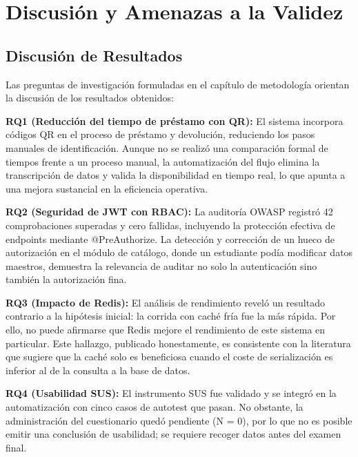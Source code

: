 \documentclass[
11pt,
a4paper,
]{report}
\begin{document}
	\hypertarget{discusion-y-amenazas-a-la-validez}{%
		\chapter{Discusión y Amenazas a la Validez}\label{discusion-y-amenazas-a-la-validez}}
	
	\hypertarget{discusion-de-resultados}{%
		\section{Discusión de Resultados}\label{discusion-de-resultados}}
	
	Las preguntas de investigación formuladas en el capítulo de metodología orientan la discusión de los resultados obtenidos:
	
	\textbf{RQ1 (Reducción del tiempo de préstamo con QR):} El sistema incorpora códigos QR en el proceso de préstamo y devolución, reduciendo los pasos manuales de identificación. Aunque no se realizó una comparación formal de tiempos frente a un proceso manual, la automatización del flujo elimina la transcripción de datos y valida la disponibilidad en tiempo real, lo que apunta a una mejora sustancial en la eficiencia operativa.
	
	\textbf{RQ2 (Seguridad de JWT con RBAC):} La auditoría OWASP registró 42 comprobaciones superadas y cero fallidas, incluyendo la protección efectiva de endpoints mediante @PreAuthorize. La detección y corrección de un hueco de autorización en el módulo de catálogo, donde un estudiante podía modificar datos maestros, demuestra la relevancia de auditar no solo la autenticación sino también la autorización fina.
	
	\textbf{RQ3 (Impacto de Redis):} El análisis de rendimiento reveló un resultado contrario a la hipótesis inicial: la corrida con caché fría fue la más rápida. Por ello, no puede afirmarse que Redis mejore el rendimiento de este sistema en particular. Este hallazgo, publicado honestamente, es consistente con la literatura que sugiere que la caché solo es beneficiosa cuando el coste de serialización es inferior al de la consulta a la base de datos.
	
	\textbf{RQ4 (Usabilidad SUS):} El instrumento SUS fue validado y se integró en la automatización con cinco casos de autotest que pasan. No obstante, la administración del cuestionario quedó pendiente (N = 0), por lo que no es posible emitir una conclusión de usabilidad; se requiere recoger datos antes del examen final.
	
\end{document}
